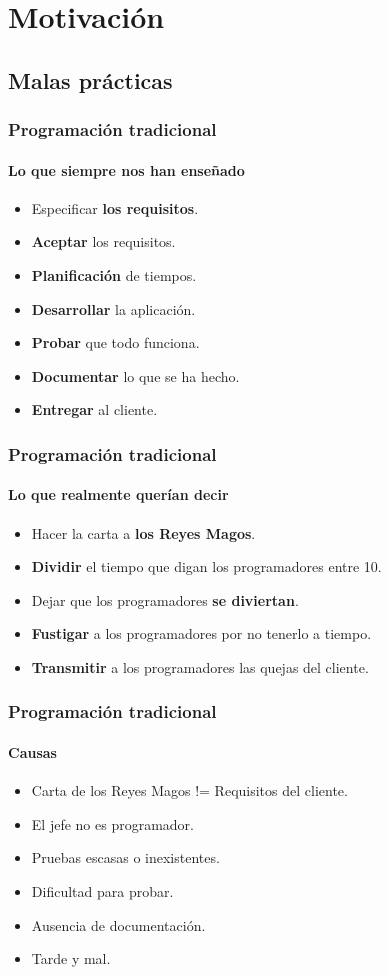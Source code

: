 \section{Motivación}

\subsection{Malas prácticas}

\begin{frame}
  \frametitle{Programación tradicional}
  \framesubtitle{Lo que siempre nos han enseñado}

  \begin{itemize}
  \item Especificar \textbf{los requisitos}.
  \item \textbf{Aceptar} los requisitos.
  \item \textbf{Planificación} de tiempos.
  \item \textbf{Desarrollar} la aplicación.
  \item \textbf{Probar} que todo funciona.
  \item \textbf{Documentar} lo que se ha hecho.
  \item \textbf{Entregar} al cliente.
  \end{itemize}
\end{frame}

\begin{frame}
  \frametitle{Programación tradicional}
  \framesubtitle{Lo que realmente querían decir}

  \begin{itemize}
  \item Hacer la carta a \textbf{los Reyes Magos}.
  \item \textbf{Dividir} el tiempo que digan los programadores entre 10.
  \item Dejar que los programadores \textbf{se diviertan}.
  \item \textbf{Fustigar} a los programadores por no tenerlo a tiempo.
  \item \textbf{Transmitir} a los programadores las quejas del cliente.
  \end{itemize}
\end{frame}


\begin{frame}
  \frametitle{Programación tradicional}
  \framesubtitle{Causas}

  \begin{itemize}
  \item Carta de los Reyes Magos != Requisitos del cliente.
  \item El jefe no es programador.
  \item Pruebas escasas o inexistentes.
  \item Dificultad para probar.
  \item Ausencia de documentación.
  \item Tarde y mal.
  \end{itemize}
\end{frame}


